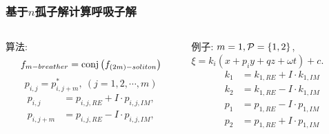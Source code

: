 \begin{frame}
\frametitle{基于$n$孤子解计算呼吸子解}
\begin{columns}
\begin{column}{0.5\textwidth}
算法:
\[
    f_{m-breather}={\rm conj}\left(f_{(2m)-soliton}\right) 
\]
\[
    p_{i,j}=p_{i,j+m}^*,~(j=1,2,\cdots,m)
\]
\[
\begin{aligned}
    p_{i,j}&=p_{i,j,RE}+I\cdot p_{i,j,IM}, \\ 
    p_{i,j+m}&=p_{i,j,RE}-I\cdot p_{i,j,IM},
\end{aligned}
\]
\end{column}
\begin{column}{0.5\textwidth}
例子: $m=1,\mathcal{P}=\left\{1,2\right\}$,\\$\xi=k_i(x+p_i y+qz+\omega t)+c$.
\[
\begin{aligned}
    k_1&=k_{1,RE}+I\cdot k_{1,IM} \\ 
    k_2&=k_{1,RE}-I\cdot k_{1,IM} \\
    p_1&=p_{1,RE}-I\cdot p_{1,IM} \\
    p_2&=p_{1,RE}+I\cdot p_{1,IM} \\ 
\end{aligned} 
\]
\end{column}
\end{columns}
\end{frame}

